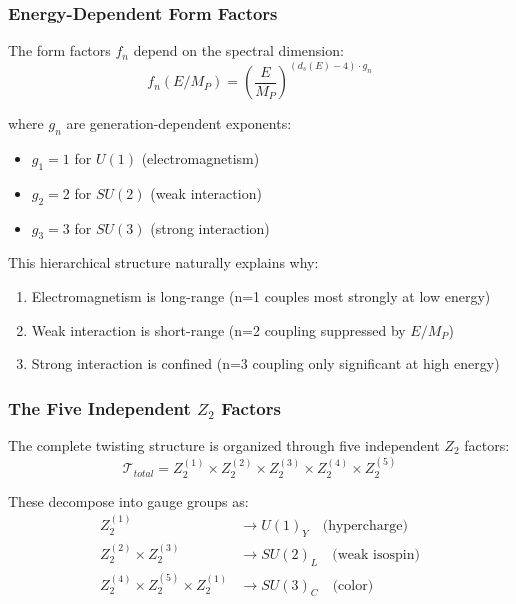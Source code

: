 \subsubsection{Energy-Dependent Form Factors}

The form factors $f_n$ depend on the spectral dimension:
\begin{equation}
    f_n(E/M_P) = \left(\frac{E}{M_P}\right)^{(d_s(E) - 4) \cdot g_n}
\end{equation}

where $g_n$ are generation-dependent exponents:
\begin{itemize}
    \item $g_1 = 1$ for $U(1)$ (electromagnetism)
    \item $g_2 = 2$ for $SU(2)$ (weak interaction)
    \item $g_3 = 3$ for $SU(3)$ (strong interaction)
\end{itemize}

This hierarchical structure naturally explains why:
\begin{enumerate}
    \item Electromagnetism is long-range (n=1 couples most strongly at low energy)
    \item Weak interaction is short-range (n=2 coupling suppressed by $E/M_P$)
    \item Strong interaction is confined (n=3 coupling only significant at high energy)
\end{enumerate}

\subsubsection{The Five Independent $Z_2$ Factors}

The complete twisting structure is organized through five independent $Z_2$ factors:
\begin{equation}
    \mathcal{T}_{total} = Z_2^{(1)} \times Z_2^{(2)} \times Z_2^{(3)} \times Z_2^{(4)} \times Z_2^{(5)}
\end{equation}

These decompose into gauge groups as:
\begin{align}
    Z_2^{(1)} &\to U(1)_Y \quad \text{(hypercharge)} \\
    Z_2^{(2)} \times Z_2^{(3)} &\to SU(2)_L \quad \text{(weak isospin)} \\
    Z_2^{(4)} \times Z_2^{(5)} \times Z_2^{(1)} &\to SU(3)_C \quad \text{(color)}
\end{align}

